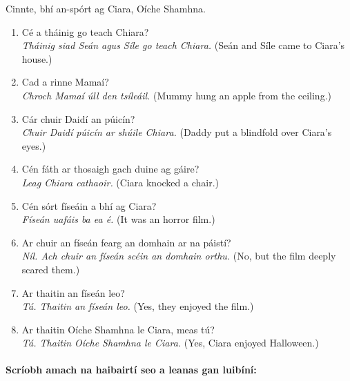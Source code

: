 \documentclass[article,a4paper,oneside,12pt]{memoir}
\begin{document}
Cinnte, bhí an-spórt ag Ciara, Oíche Shamhna.

\begin{enumerate}
  \item C\'{e} a tháinig go teach Chiara?\\
    	\emph{Tháinig siad Seán agus Síle go teach Chiara.}
	{\tiny (Seán and Síle came to Ciara's house.)}
  \item Cad a rinne Mamaí?\\
    	\emph{Chroch Mamaí úll den tsíleáil.}
	{\tiny (Mummy hung an apple from the ceiling.)}
  \item Cár chuir Daidí an púicín?\\
    	\emph{Chuir Daidí púicín ar shúile Chiara.}
	{\tiny (Daddy put a blindfold over Ciara's eyes.)}
  \item C\'{e}n fáth ar thosaigh gach duine ag gáire?\\
    	\emph{Leag Chiara cathaoir.}
	{\tiny (Ciara knocked a chair.)}
  \item C\'{e}n sórt físeáin a bhí ag Ciara?\\
    	\emph{Físeán uafáis ba ea \'{e}.}
	{\tiny (It was an horror film.)}
  \item Ar chuir an físeán fearg an domhain ar na páistí?\\
    	\emph{Níl. Ach chuir an físeán sc\'{e}in an domhain orthu.}
	{\tiny (No, but the film deeply scared them.)}
  \item Ar thaitin an físeán leo?\\
    	\emph{Tá. Thaitin an físeán leo.}    	
	{\tiny (Yes, they enjoyed the film.)}
  \item Ar thaitin Oíche Shamhna le Ciara, meas tú?\\
    	\emph{Tá. Thaitin Oíche Shamhna le Ciara.}
	{\tiny (Yes, Ciara enjoyed Halloween.)}
\end{enumerate}

\clearpage

\paragraph{Scríobh amach na haibairtí seo a leanas gan luibíní:}
\end{document}
